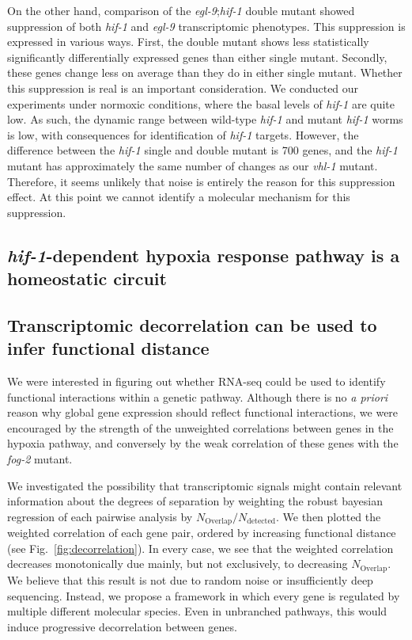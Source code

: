 \documentclass[9pt,twocolumn,twoside]{pnas-new}
\newcommand{\egl}{\emph{egl-9}}
\newcommand{\vhl}{\emph{vhl-1}}
\newcommand{\hif}{\emph{hif-1}}
\newcommand{\fog}{\emph{fog-2}}
\begin{document}
On the other hand, comparison of the \egl{};\hif{} double mutant showed suppression of both \hif{} and \egl{} transcriptomic phenotypes. This suppression is expressed in various ways. First, the double mutant shows less statistically significantly differentially expressed genes than either single mutant. Secondly, these genes change less on average than they do in either single mutant. Whether this suppression is real is an important consideration. We conducted our experiments under normoxic conditions, where the basal levels of \hif{} are quite low. As such, the dynamic range between wild-type \hif{} and mutant \hif{} worms is low, with consequences for identification of \hif{} targets.
However, the difference between the \hif{} single and double mutant is 700 genes, and the \hif{} mutant has approximately the same number of changes as our \vhl{} mutant. Therefore, it seems unlikely that noise is entirely the reason for this suppression effect. At this point we cannot identify a molecular mechanism for this suppression.

\subsection{\hif{}-dependent hypoxia response pathway is a homeostatic circuit}
\label{sub:homeostatic_circuit}

\subsection{Transcriptomic decorrelation can be used to infer functional distance}
\label{sub:decorrelation}
We were interested in figuring out whether RNA-seq could be used to identify functional interactions within a genetic pathway. Although there is no \emph{a priori} reason why global gene expression should reflect functional interactions, we were encouraged by the strength of the unweighted correlations between genes in the hypoxia pathway, and conversely by the weak correlation of these genes with the \fog{} mutant.

We investigated the possibility that transcriptomic signals might contain relevant information about the degrees of separation by weighting the robust bayesian regression of each pairwise analysis by $N_\mathrm{Overlap}/N_{\mathrm{detected}}$. We then plotted the weighted correlation of each gene pair, ordered by increasing functional distance (see Fig.~\ref{fig:decorrelation}). In every case, we see that the weighted correlation decreases monotonically due mainly, but not exclusively, to decreasing $N_\mathrm{Overlap}$.
We believe that this result is not due to random noise or insufficiently deep sequencing. Instead, we propose a framework in which every gene is regulated by multiple different molecular species. Even in unbranched pathways, this would induce progressive decorrelation between genes.
\end{document}
